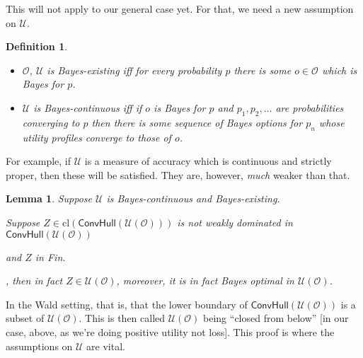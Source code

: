 \documentclass[a4paper]{article}
\newtheorem{definition}{Definition}
\newtheorem{lemma}[theorem]{Lemma}
\newtheorem{corollary}[theorem]{Corollary}
\newcommand\cl{\mathrm{cl}}
\renewcommand\O{\mathcal{O}}
\newcommand\Uwald{\mathcal{U}} %
\newcommand{\Conv}{\mathsf{ConvHull}}
\newenvironment{CCM rewritten}
{\begingroup\color{blue}} %
{\endgroup}              %
\begin{document}
	
	
	
	This will not apply to our general case yet. For that, we need a new assumption on $\Uwald$. 




\begin{definition}\ 
	\begin{itemize}
		\item $\O$, $\Uwald$ is \emph{Bayes-existing} iff for every probability $p$ there is some $o\in\O$ which is Bayes for $p$.
		\item $\Uwald$ is \emph{Bayes-continuous} iff if $o$ is Bayes for $p$ and $p_1,p_2,\ldots$ are probabilities converging to $p$ then there is some sequence of Bayes options for $p_n$ whose utility profiles converge to those of $o$. 
	\end{itemize}
\end{definition}
For example, if $\Uwald$ is a measure of accuracy which is continuous and strictly proper, then these will be satisfied. They are, however, \emph{much} weaker than that.
	
	\begin{lemma}\label{thm:cct:bdry are the Bayes optimal}
		Suppose $\Uwald$ is Bayes-continuous and Bayes-existing. 
		
		
		Suppose $Z\in\cl(\Conv(\Uwald(\O)))$ is not weakly dominated in $\Conv(\Uwald(\O))$\begin{infversion}
			and $Z$ in Fin.
		\end{infversion}, then in fact $Z\in \Uwald(\O)$, moreover, it is in fact Bayes optimal in $\Uwald(\O)$. 
%		
	\end{lemma}
	In the Wald setting, that is, that the lower boundary of $\Conv(\Uwald(\O))$ is a subset of $\Uwald(\O)$. This is then called $\Uwald(\O)$ being ``closed from below'' [in our case, above, as we're doing positive utility not loss]. This proof is where the assumptions on $\Uwald$ are vital. 
	
\end{document}
